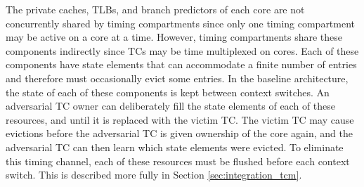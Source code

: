 The private caches, TLBs, and branch predictors of each core are not 
concurrently shared by timing compartments since only one timing compartment 
may be active on a core at a time. However, timing compartments share these 
components indirectly since TCs may be time multiplexed on cores.  Each of 
these components have state elements that can accommodate a finite number of 
entries and therefore must occasionally evict some entries. In the baseline 
architecture, the state of each of these components is kept between context 
switches. An adversarial TC owner can deliberately fill the state elements of 
each of these resources, and until it is replaced with the victim TC. The 
victim TC may cause evictions before the adversarial TC is given ownership of 
the core again, and the adversarial TC can then learn which state elements were 
evicted. To eliminate this timing channel, each of these resources must be 
flushed before each context switch. This is described more fully in Section 
\ref{sec:integration_tcm}.

